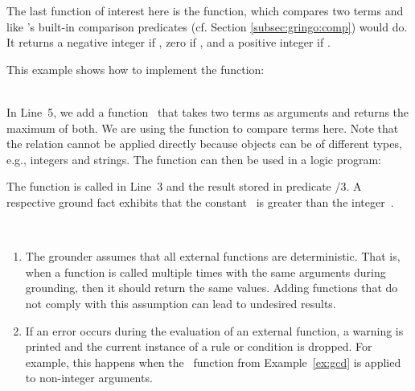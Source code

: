 The last function of interest here is the  function,
which compares two terms  and 
like \gringo's built-in comparison predicates (cf. Section \ref{subsec:gringo:comp}) would do.
It returns a negative integer if , zero if , and a positive integer if .
\begin{example}
This example shows how to implement the  function:
\\[-8pt] %
\begin{minipage}[t]{0.5\textwidth}

\end{minipage}
\begin{minipage}[t]{0.5\textwidth}

\end{minipage}\\
In Line~5, we add a function~
that  takes two terms as arguments
and returns the maximum of both.
We are using the  function to compare terms here.
Note that the \code{>} relation cannot be applied directly 
because objects can be of different types,
e.g., integers and strings.
The  function can then be used in a logic program:%
%

%
The function is called in Line~3 and the result stored in predicate /$3$.
A respective ground fact exhibits that the constant~ is greater than
the integer~.
\end{example}

\begin{note}~
\begin{enumerate}
\item The grounder assumes that all external functions are deterministic.
That is, when a function is called multiple times with the same arguments during grounding,
then it should return the same values.
Adding functions that do not comply with this assumption can lead to undesired results.
\item If an error occurs during the evaluation of an external function,
a warning is printed and the current instance of a rule or condition is dropped.
For example, this happens when the~ function from Example~\ref{ex:gcd} is applied to non-integer arguments.
\end{enumerate}
\end{note}

